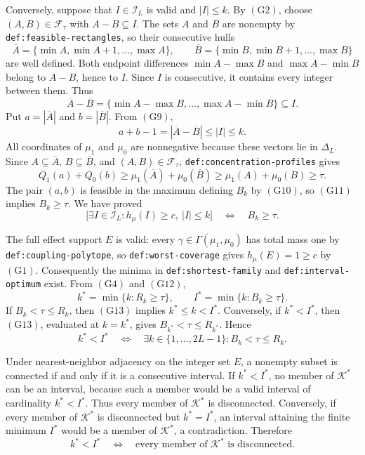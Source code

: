 Conversely, suppose that \(I\in\mathcal I_L\) is valid and \(|I|\leq k\).  By \((\mathrm{G2})\), choose \((A,B)\in\mathcal F_\tau\) with \(A-B\subseteq I\).  The sets \(A\) and \(B\) are nonempty by \texttt{def:feasible-rectangles}, so their consecutive hulls
\[
\overline A=\{\min A,\min A+1,\ldots,\max A\},
\qquad
\overline B=\{\min B,\min B+1,\ldots,\max B\}
\tag{G8}
\]
are well defined.  Both endpoint differences \(\min A-\max B\) and \(\max A-\min B\) belong to \(A-B\), hence to \(I\).  Since \(I\) is consecutive, it contains every integer between them.  Thus
\[
\overline A-\overline B
=\{\min A-\max B,\ldots,\max A-\min B\}
\subseteq I.
\tag{G9}
\]
Put \(a=|\overline A|\) and \(b=|\overline B|\).  From \((\mathrm{G9})\),
\[
a+b-1=|\overline A-\overline B|\leq |I|\leq k.
\tag{G10}
\]
All coordinates of \(\mu_1\) and \(\mu_0\) are nonnegative because these vectors lie in \(\Delta_L\).  Since \(A\subseteq\overline A\), \(B\subseteq\overline B\), and \((A,B)\in\mathcal F_\tau\), \texttt{def:concentration-profiles} gives
\[
Q_1(a)+Q_0(b)
\geq \mu_1(\overline A)+\mu_0(\overline B)
\geq \mu_1(A)+\mu_0(B)
\geq\tau.
\tag{G11}
\]
The pair \((a,b)\) is feasible in the maximum defining \(B_k\) by \((\mathrm{G10})\), so \((\mathrm{G11})\) implies \(B_k\geq\tau\).  We have proved
\[
\bigl[\exists I\in\mathcal I_L:h_\mu(I)\geq c,\ |I|\leq k\bigr]
\quad\Longleftrightarrow\quad B_k\geq\tau.
\tag{G12}
\]

The full effect support \(E\) is valid: every \(\gamma\in\Gamma(\mu_1,\mu_0)\) has total mass one by \texttt{def:coupling-polytope}, so \texttt{def:worst-coverage} gives \(h_\mu(E)=1\geq c\) by \((\mathrm{G1})\).  Consequently the minima in \texttt{def:shortest-family} and \texttt{def:interval-optimum} exist.  From \((\mathrm{G4})\) and \((\mathrm{G12})\),
\[
k^*=\min\{k:R_k\geq\tau\},
\qquad
I^*=\min\{k:B_k\geq\tau\}.
\tag{G13}
\]
If \(B_k<\tau\leq R_k\), then \((\mathrm{G13})\) implies \(k^*\leq k<I^*\).  Conversely, if \(k^*<I^*\), then \((\mathrm{G13})\), evaluated at \(k=k^*\), gives \(B_{k^*}<\tau\leq R_{k^*}\).  Hence
\[
k^*<I^*
\quad\Longleftrightarrow\quad
\exists k\in\{1,\ldots,2L-1\}:B_k<\tau\leq R_k.
\tag{G14}
\]

Under nearest-neighbor adjacency on the integer set \(E\), a nonempty subset is connected if and only if it is a consecutive interval.  If \(k^*<I^*\), no member of \(\mathcal K^*\) can be an interval, because such a member would be a valid interval of cardinality \(k^*<I^*\).  Thus every member of \(\mathcal K^*\) is disconnected.  Conversely, if every member of \(\mathcal K^*\) is disconnected but \(k^*=I^*\), an interval attaining the finite minimum \(I^*\) would be a member of \(\mathcal K^*\), a contradiction.  Therefore
\[
k^*<I^*
\quad\Longleftrightarrow\quad
\text{every member of }\mathcal K^*\text{ is disconnected}.
\tag{G15}
\]

